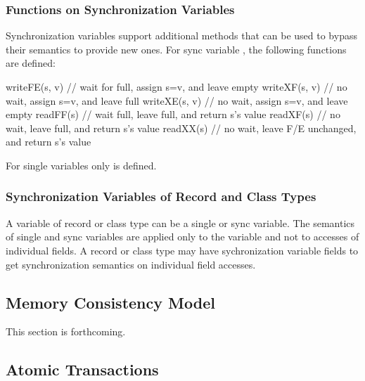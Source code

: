 \subsubsection{Functions on Synchronization Variables}
\label{Functions_on_Synchronization_Variables}

Synchronization variables support additional methods that
can be used to bypass their semantics to provide new ones. For
sync variable , the following functions are defined:
\begin{chapel}
writeFE(s, v) // wait for full, assign s=v, and leave empty
writeXF(s, v) // no wait, assign s=v, and leave full
writeXE(s, v) // no wait, assign s=v, and leave empty
readFF(s)     // wait full, leave full, and return s's value
readXF(s)     // no wait, leave full, and return s's value
readXX(s)     // no wait, leave F/E unchanged, and return s's value
\end{chapel}

For single variables  only  is defined.

\subsubsection{Synchronization Variables of Record and Class Types}
\label{Synchronization_Variables_of_Record_Type}

A variable of record or class type can be a single or sync
variable. The semantics of single and sync variables are applied only
to the variable and not to accesses of individual fields.  A record or
class type may have sychronization variable fields to get
synchronization semantics on individual field accesses.

\subsection{Memory Consistency Model}
\label{Memory_Consistency}

This section is forthcoming.

\subsection{Atomic Transactions}
\label{Atomic_Transactions}

